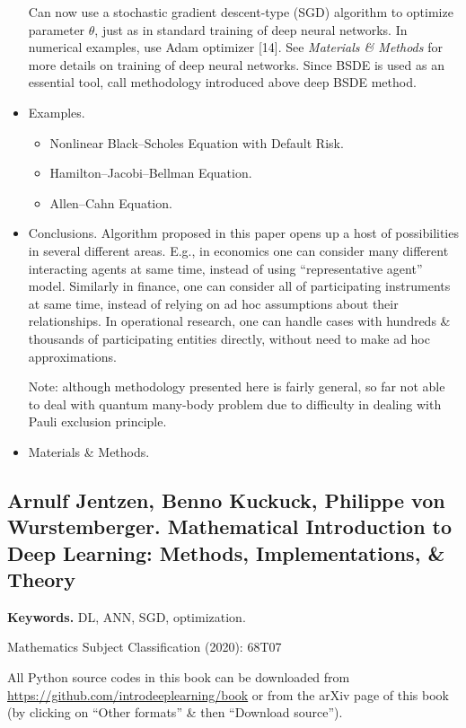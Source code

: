 \documentclass{article}
\begin{document}
\begin{itemize}
	Can now use a stochastic gradient descent-type (SGD) algorithm to optimize parameter $\theta$, just as in standard training of deep neural networks. In numerical examples, use Adam optimizer [14]. See {\it Materials \& Methods} for more details on training of deep neural networks. Since BSDE is used as an essential tool, call methodology introduced above deep BSDE method.
	\item {\sf Examples.}
	\begin{itemize}
		\item {\sf Nonlinear Black--Scholes Equation with Default Risk.}
		\item {\sf Hamilton--Jacobi--Bellman Equation.}
		\item {\sf Allen--Cahn Equation.}
	\end{itemize}
	\item {\sf Conclusions.} Algorithm proposed in this paper opens up a host of possibilities in several different areas. E.g., in economics one can consider many different interacting agents at same time, instead of using ``representative agent'' model. Similarly in finance, one can consider all of participating instruments at same time, instead of relying on ad hoc assumptions about their relationships. In operational research, one can handle cases with hundreds \& thousands of participating entities directly, without need to make ad hoc approximations.
	
	Note: although methodology presented here is fairly general, so far not able to deal with quantum many-body problem due to difficulty in dealing with Pauli exclusion principle.
	\item {\sf Materials \& Methods.}
\end{itemize}


\subsection{{\sc Arnulf Jentzen, Benno Kuckuck, Philippe von Wurstemberger}. Mathematical Introduction to Deep Learning: Methods, Implementations, \& Theory}
{\bf Keywords.} DL, ANN, SGD, optimization.

Mathematics Subject Classification (2020): 68T07

All Python source codes in this book can be downloaded from \url{https://github.com/introdeeplearning/book} or from the arXiv page of this book (by clicking on ``Other formats'' \& then ``Download source'').
\end{document}
